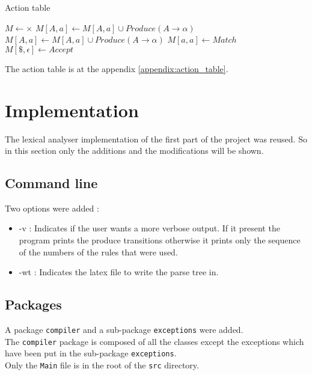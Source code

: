 \documentclass{article}
\begin{document}
\begin{algorithm}
\caption{Action table}
\begin{algorithmic}
\STATE $M \gets \times$
        \STATE $M[A,a] \gets M[A,a] \cup Produce(A \to \alpha)$
    \ENDFOR
            \STATE $M[A,a] \gets M[A,a] \cup Produce(A \to \alpha)$
        \ENDFOR
    \ENDIF
\ENDFOR
{}
    \STATE $M[a,a] \gets Match$
\ENDFOR
\STATE $M[\$,\epsilon] \gets Accept$
\end{algorithmic}
\end{algorithm}

\noindent The action table is at the appendix \ref{appendix:action_table}.

\section{Implementation}
The lexical analyser implementation of the first part of the project was reused. So in this section only the additions and the modifications will be shown.

\subsection{Command line}
Two options were added :
\begin{itemize}
    \item -v : Indicates if the user wants a more verbose output. If it present the program prints the produce transitions otherwise it prints only the sequence of the numbers of the rules that were used.
    \item -wt : Indicates the latex file to write the parse tree in.
\end{itemize}

\subsection{Packages}
A package \texttt{compiler} and a sub-package \texttt{exceptions} were added.\\

\noindent The \texttt{compiler} package is composed of all the classes except the exceptions which have been put in the sub-package \texttt{exceptions}.\\

\noindent Only the \texttt{Main} file is in the root of the \texttt{src} directory.
\end{document}
